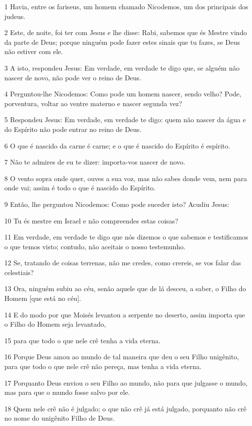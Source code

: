 \par 1 Havia, entre os fariseus, um homem chamado Nicodemos, um dos principais dos judeus.
\par 2 Este, de noite, foi ter com Jesus e lhe disse: Rabi, sabemos que és Mestre vindo da parte de Deus; porque ninguém pode fazer estes sinais que tu fazes, se Deus não estiver com ele.
\par 3 A isto, respondeu Jesus: Em verdade, em verdade te digo que, se alguém não nascer de novo, não pode ver o reino de Deus.
\par 4 Perguntou-lhe Nicodemos: Como pode um homem nascer, sendo velho? Pode, porventura, voltar ao ventre materno e nascer segunda vez?
\par 5 Respondeu Jesus: Em verdade, em verdade te digo: quem não nascer da água e do Espírito não pode entrar no reino de Deus.
\par 6 O que é nascido da carne é carne; e o que é nascido do Espírito é espírito.
\par 7 Não te admires de eu te dizer: importa-vos nascer de novo.
\par 8 O vento sopra onde quer, ouves a sua voz, mas não sabes donde vem, nem para onde vai; assim é todo o que é nascido do Espírito.
\par 9 Então, lhe perguntou Nicodemos: Como pode suceder isto? Acudiu Jesus:
\par 10 Tu és mestre em Israel e não compreendes estas coisas?
\par 11 Em verdade, em verdade te digo que nós dizemos o que sabemos e testificamos o que temos visto; contudo, não aceitais o nosso testemunho.
\par 12 Se, tratando de coisas terrenas, não me credes, como crereis, se vos falar das celestiais?
\par 13 Ora, ninguém subiu ao céu, senão aquele que de lá desceu, a saber, o Filho do Homem [que está no céu].
\par 14 E do modo por que Moisés levantou a serpente no deserto, assim importa que o Filho do Homem seja levantado,
\par 15 para que todo o que nele crê tenha a vida eterna.
\par 16 Porque Deus amou ao mundo de tal maneira que deu o seu Filho unigênito, para que todo o que nele crê não pereça, mas tenha a vida eterna.
\par 17 Porquanto Deus enviou o seu Filho ao mundo, não para que julgasse o mundo, mas para que o mundo fosse salvo por ele.
\par 18 Quem nele crê não é julgado; o que não crê já está julgado, porquanto não crê no nome do unigênito Filho de Deus.
